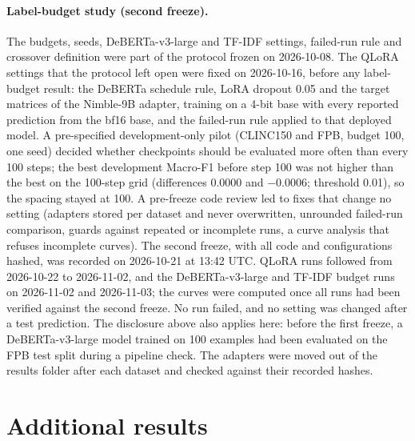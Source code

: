 \paragraph{Label-budget study (second freeze).}
The budgets, seeds, DeBERTa-v3-large and TF-IDF settings, failed-run rule and crossover definition were part of the
protocol frozen on 2026-10-08. The QLoRA settings that the protocol left open were fixed on 2026-10-16, before any
label-budget result: the DeBERTa schedule rule, LoRA dropout 0.05 and the target matrices of the Nimble-9B adapter,
training on a 4-bit base with every reported prediction from the bf16 base, and the failed-run rule applied to that
deployed model. A pre-specified development-only pilot (CLINC150 and FPB, budget 100, one seed) decided whether
checkpoints should be evaluated more often than every 100 steps; the best development Macro-F1 before step 100 was not
higher than the best on the 100-step grid (differences 0.0000 and $-0.0006$; threshold 0.01), so the spacing stayed
at 100. A pre-freeze code review led to
fixes that change no setting (adapters stored per dataset and never overwritten, unrounded failed-run comparison, guards
against repeated or incomplete runs, a curve analysis that refuses incomplete curves). The second freeze, with all
code and configurations hashed, was recorded on 2026-10-21 at 13:42 UTC. QLoRA runs followed from 2026-10-22 to
2026-11-02, and the DeBERTa-v3-large and TF-IDF budget runs on 2026-11-02 and 2026-11-03; the curves were computed
once all runs had been verified against the second freeze. No run failed, and no setting was changed after a test
prediction. The disclosure above also applies here: before the first freeze, a DeBERTa-v3-large model trained on 100
examples had been evaluated on the FPB test split during a pipeline check. The adapters were moved out of the results
folder after each dataset and checked against their recorded hashes.

\FloatBarrier
\section{Additional results}
\label{app:results}

\begin{table}[htbp]
  \centering
  \caption{\textbf{Fourteen of the 35 confirmatory tests are significant after Holm correction.} Paired differences in percentage points (TDM $-$ base for P1/P2; Jev $-$
  DeBERTa-v3-large for PA1/PA2; EM $-$ none for PA3) with unadjusted 95\% bootstrap intervals, raw two-sided $p$ and
  Holm-adjusted $p$ over the 35 tests. Shaded: Holm-adjusted $p<0.05$.}
  \label{tab:alltests}
  \scriptsize
  
\end{table}

